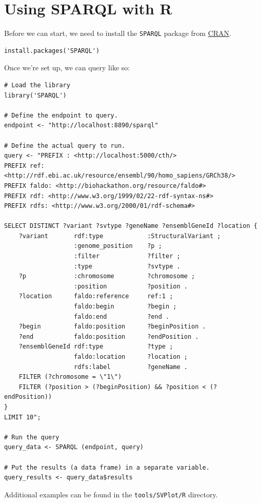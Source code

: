 \documentclass[11pt,a4paper,oneside]{book}
\begin{document}
\section{Using SPARQL with R}
\label{sec:sparql-with-r}

  Before we can start, we need to install the \texttt{SPARQL} package from
  \href{https://cran.r-project.org/web/packages/SPARQL/index.html}{CRAN}.

\begin{siderules}
\begin{verbatim}
install.packages('SPARQL')
\end{verbatim}
\end{siderules}

  Once we're set up, we can query like so:

\begin{siderules}
\begin{verbatim}
# Load the library
library('SPARQL')

# Define the endpoint to query.
endpoint <- "http://localhost:8890/sparql"

# Define the actual query to run.
query <- "PREFIX : <http://localhost:5000/cth/>
PREFIX ref: <http://rdf.ebi.ac.uk/resource/ensembl/90/homo_sapiens/GRCh38/>
PREFIX faldo: <http://biohackathon.org/resource/faldo#>
PREFIX rdf: <http://www.w3.org/1999/02/22-rdf-syntax-ns#>
PREFIX rdfs: <http://www.w3.org/2000/01/rdf-schema#>

SELECT DISTINCT ?variant ?svtype ?geneName ?ensemblGeneId ?location {
    ?variant       rdf:type            :StructuralVariant ;
                   :genome_position    ?p ;
                   :filter             ?filter ;
                   :type               ?svtype .
    ?p             :chromosome         ?chromosome ;
                   :position           ?position .
    ?location      faldo:reference     ref:1 ;
                   faldo:begin         ?begin ;
                   faldo:end           ?end .
    ?begin         faldo:position      ?beginPosition .
    ?end           faldo:position      ?endPosition .
    ?ensemblGeneId rdf:type            ?type ;
                   faldo:location      ?location ;
                   rdfs:label          ?geneName .
    FILTER (?chromosome = \"1\")
    FILTER (?position > (?beginPosition) && ?position < (?endPosition))
}
LIMIT 10";

# Run the query
query_data <- SPARQL (endpoint, query)

# Put the results (a data frame) in a separate variable.
query_results <- query_data$results
\end{verbatim}
\end{siderules}

Additional examples can be found in the \texttt{tools/SVPlot/R} directory.


\end{document}
